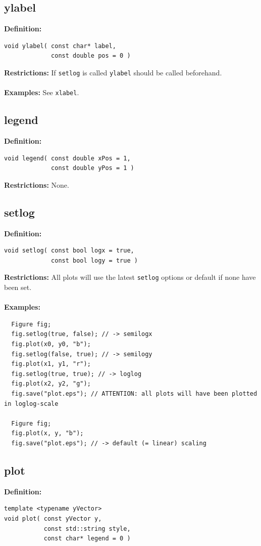 \documentclass[a4paper]{article}
\newcommand{\command}[1]{\subsection{#1}}
\begin{document}
\newpage
\command{ylabel}

\textbf{Definition:}
\begin{lstlisting}
void ylabel( const char* label, 
             const double pos = 0 )
\end{lstlisting}
%
\textbf{Restrictions:} If \texttt{setlog} is called \texttt{ylabel} should be called beforehand. \\ \\
%
\textbf{Examples:} See \texttt{xlabel}.

\command{legend}

\textbf{Definition:}
\begin{lstlisting}
void legend( const double xPos = 1, 
             const double yPos = 1 )
\end{lstlisting}
%
\textbf{Restrictions:} None. 

\command{setlog}

\textbf{Definition:}
\begin{lstlisting}
void setlog( const bool logx = true, 
             const bool logy = true )
\end{lstlisting}
%
\textbf{Restrictions:} All plots will use the latest \texttt{setlog} options or default if none have been set. \\ \\
%
\textbf{Examples:}
\begin{lstlisting}
  Figure fig;
  fig.setlog(true, false); // -> semilogx
  fig.plot(x0, y0, "b"); 
  fig.setlog(false, true); // -> semilogy
  fig.plot(x1, y1, "r");
  fig.setlog(true, true); // -> loglog
  fig.plot(x2, y2, "g");
  fig.save("plot.eps"); // ATTENTION: all plots will have been plotted in loglog-scale 

  Figure fig;
  fig.plot(x, y, "b");
  fig.save("plot.eps"); // -> default (= linear) scaling
\end{lstlisting}


\command{plot} 

\textbf{Definition:} 
\begin{lstlisting}
template <typename yVector>
void plot( const yVector y, 
           const std::string style, 
           const char* legend = 0 )
\end{lstlisting}
\newpage
\end{document}
